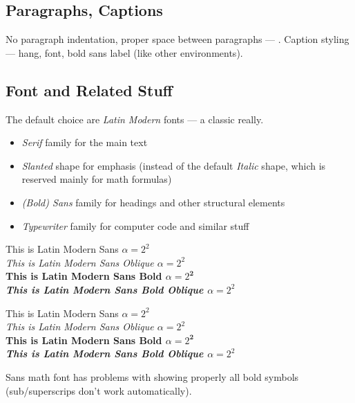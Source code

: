 \subsection{Paragraphs, Captions}%
\label{sub:Paragraphs}

No paragraph indentation, proper space between paragraphs --- .
Caption styling --- hang, \macro{\footnotesize} font, bold sans label (like other environments).

\subsection{Font and Related Stuff}%
\label{sub:Font}

The default choice are \emph{Latin Modern} fonts --- a classic really.
\begin{itemize}
    \item \emph{Serif} family for the main text
    \item \emph{Slanted} shape for emphasis (instead of the default \emph{Italic} shape, which is reserved mainly for math formulas)
    \item \emph{(Bold) Sans} family for headings and other structural elements
    \item \emph{Typewriter} family for computer code and similar stuff
\end{itemize}

{                  This is Latin Modern Sans \(\alpha = 2^{2}\)}\\
{\slshape          This is Latin Modern Sans Oblique \(\alpha = 2^{2}\)}\\
{\bfseries         This is Latin Modern Sans Bold \(\alpha = 2^{\bm{{2}}}\)}\\
{\bfseries\slshape This is Latin Modern Sans Bold Oblique \(\alpha = 2^{2}\)}

{\sffamily                  This is Latin Modern Sans \(\alpha = 2^{2}\)}\\
{\sffamily\slshape          This is Latin Modern Sans Oblique \(\alpha = 2^{2}\)}\\
{\sffamily\bfseries         This is Latin Modern Sans Bold \(\alpha = 2^{\bm{{2}}}\)}\\
{\sffamily\bfseries\slshape This is Latin Modern Sans Bold Oblique \(\alpha = 2^{2}\)}
\begin{Note}
    Sans math font has problems with showing properly all bold symbols (sub/superscrips don't work automatically).
\end{Note}

